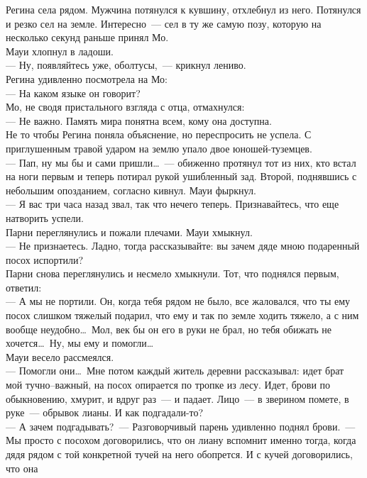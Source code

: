Регина села рядом. Мужчина потянулся к кувшину, отхлебнул из него. Потянулся и 
резко сел на земле. Интересно~--- сел в ту же самую позу, которую на несколько 
секунд раньше принял Мо.\\
Мауи хлопнул в ладоши.\\
--- Ну, появляйтесь уже, оболтусы,~--- крикнул лениво.\\
Регина удивленно посмотрела на Мо:\\
--- На каком языке он говорит?\\
Мо, не сводя пристального взгляда с отца, отмахнулся:\\
--- Не важно. Память мира понятна всем, кому она доступна.\\
Не то чтобы Регина поняла объяснение, но переспросить не успела. С приглушенным 
травой ударом на землю упало двое юношей-туземцев.\\
--- Пап, ну мы бы и сами пришли\ldots~--- обиженно протянул тот из них, кто 
встал на ноги первым и теперь потирал рукой ушибленный зад. Второй, поднявшись с 
небольшим опозданием, согласно кивнул. Мауи фыркнул.\\
--- Я вас три часа назад звал, так что нечего теперь. Признавайтесь, что еще 
натворить успели.\\
Парни переглянулись и пожали плечами. Мауи хмыкнул.\\
--- Не признаетесь. Ладно, тогда рассказывайте: вы зачем дяде мною подаренный 
посох испортили?\\
Парни снова переглянулись и несмело хмыкнули. Тот, что поднялся первым, ответил:\\
--- А мы не портили. Он, когда тебя рядом не было, все жаловался, что ты ему 
посох слишком тяжелый подарил, что ему и так по земле ходить тяжело, а с ним вообще 
неудобно\ldots\ Мол, век бы он его в руки не брал, но тебя обижать не 
хочется\ldots\ Ну, 
мы ему и помогли\ldots\\
Мауи весело рассмеялся.\\
--- Помогли они\ldots\ Мне потом каждый житель деревни рассказывал: идет брат мой 
тучно--важный, на посох опирается по тропке из лесу. Идет, брови по обыкновению, 
хмурит, и вдруг раз~--- и падает. Лицо~--- в зверином помете, в руке~--- 
обрывок лианы. И как подгадали-то?\\
--- А зачем подгадывать?~--- Разговорчивый парень удивленно поднял брови.~--- Мы 
просто с посохом договорились, что он лиану вспомнит именно тогда, когда дядя 
рядом с той конкретной тучей на него обопрется. И с кучей договорились, что она 
